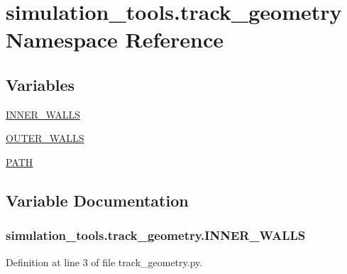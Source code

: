 \hypertarget{namespacesimulation__tools_1_1track__geometry}{}\section{simulation\+\_\+tools.\+track\+\_\+geometry Namespace Reference}
\label{namespacesimulation__tools_1_1track__geometry}
\subsection*{Variables}
\begin{DoxyCompactItemize}
\item 
\hyperlink{namespacesimulation__tools_1_1track__geometry_a74834571ee365cc622b68bfddfcaa468}{I\+N\+N\+E\+R\+\_\+\+W\+A\+L\+LS}
\item 
\hyperlink{namespacesimulation__tools_1_1track__geometry_a3f102165140d5e7d0669796d86d7eef4}{O\+U\+T\+E\+R\+\_\+\+W\+A\+L\+LS}
\item 
\hyperlink{namespacesimulation__tools_1_1track__geometry_a01bbe2fcde345b5a30e2642e8ff46947}{P\+A\+TH}
\end{DoxyCompactItemize}


\subsection{Variable Documentation}
\subsubsection[{\texorpdfstring{I\+N\+N\+E\+R\+\_\+\+W\+A\+L\+LS}{INNER_WALLS}}]{\setlength{\rightskip}{0pt plus 5cm}simulation\+\_\+tools.\+track\+\_\+geometry.\+I\+N\+N\+E\+R\+\_\+\+W\+A\+L\+LS}\hypertarget{namespacesimulation__tools_1_1track__geometry_a74834571ee365cc622b68bfddfcaa468}{}\label{namespacesimulation__tools_1_1track__geometry_a74834571ee365cc622b68bfddfcaa468}


Definition at line 3 of file track\+\_\+geometry.\+py.

